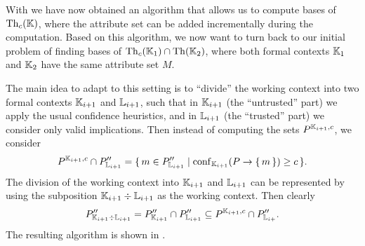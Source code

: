 With  we have now obtained an algorithm that
allows us to compute bases of $\operatorname{Th}_{c}({\mathbb{K}})$, where the attribute set can be added
incrementally during the computation.  Based on this algorithm, we now want to turn back
to our initial problem of finding bases of $\operatorname{Th}_{c}({\mathbb{K}}_{1}) \cap \operatorname{Th}({\mathbb{K}}_{2})$,
where both formal contexts ${\mathbb{K}}_{1}$ and ${\mathbb{K}}_{2}$ have the same attribute set $M$.

The main idea to adapt  to this setting is to
``divide'' the working context into two formal contexts ${\mathbb{K}}_{i+1}$ and ${\mathbb{L}}_{i+1}$,
such that in ${\mathbb{K}}_{i+1}$ (the ``untrusted'' part) we apply the usual confidence
heuristics, and in ${\mathbb{L}}_{i+1}$ (the ``trusted'' part) we consider only valid
implications.  Then instead of computing the sets $P^{{\mathbb{K}}_{i+1}, c}$, we consider
\begin{equation*}
  P^{{\mathbb{K}}_{i+1}, c} \cap P_{{\mathbb{L}}_{i+1}}'' = {\{\, m \in P_{{\mathbb{L}}_{i+1}}'' \mid
    \operatorname{conf}_{{\mathbb{K}}_{i+1}}(P \to {\ensuremath{\{\,m\,\}}}) \ge c \,\}}.
\end{equation*}
The division of the working context into ${\mathbb{K}}_{i+1}$ and ${\mathbb{L}}_{i+1}$ can be
represented by using the subposition ${\mathbb{K}}_{i+1} \div {\ensuremath{\mathbb{L}}}_{i+1}$ as the working
context.  Then clearly
\begin{equation}
  \label{eq:54}
  P_{{\mathbb{K}}_{i+1} \div {\ensuremath{\mathbb{L}}}_{i+1}}'' = P_{{\mathbb{K}}_{i+1}}'' \cap P_{{\mathbb{L}}_{i+1}}''
  \subseteq P^{{\mathbb{K}}_{i+1}, c} \cap P_{{\mathbb{L}}_{i+}}''.
\end{equation}
The resulting algorithm is shown in
.


